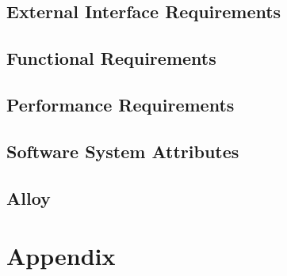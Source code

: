 \documentclass[a4paper,12pt]{report}
\begin{document}
\section{External Interface Requirements}


\section{Functional Requirements} \label{fun_req}


\section{Performance Requirements} \label{per_req}


\section{Software System Attributes} \label{software_sys_attr}


\section{Alloy} \label{alloy}


\appendix
\chapter{Appendix}



\end{document}
